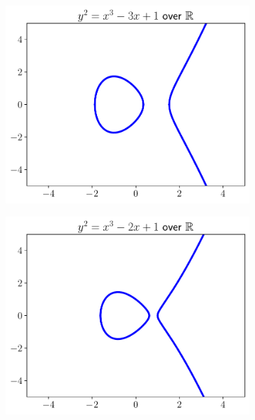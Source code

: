 \begin{figure}[p]
\centering
    \begin{subfigure}[t]{0.45\textwidth}
    \includegraphics[width=\textwidth]{plots/ec_reals/ec_reals_n3_1.pdf}
    \end{subfigure}
    \begin{subfigure}[t]{0.45\textwidth}
    \includegraphics[width=\textwidth]{plots/ec_reals/ec_reals_n2_1.pdf}
    \end{subfigure}


\end{figure}
